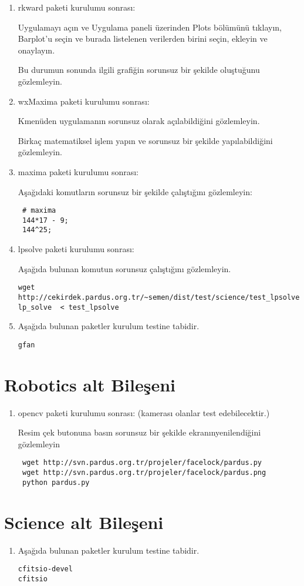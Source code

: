 \documentclass[a4paper,10pt]{article}
\begin{document}
\begin{enumerate}
\item rkward paketi kurulumu sonrası:

Uygulamayı açın ve Uygulama paneli üzerinden Plots bölümünü tıklayın, Barplot'u seçin ve burada listelenen verilerden birini seçin, ekleyin ve onaylayın. 

Bu durumun sonunda ilgili grafiğin sorunsuz bir şekilde oluştuğunu gözlemleyin.

\item wxMaxima paketi kurulumu sonrası:

Kmenüden uygulamanın sorunsuz olarak açılabildiğini gözlemleyin.

Birkaç matematiksel işlem yapın ve sorunsuz bir şekilde yapılabildiğini gözlemleyin.
\item maxima paketi kurulumu sonrası:

Aşağıdaki komutların sorunsuz bir şekilde çalıştığını gözlemleyin:
\begin{verbatim}
 # maxima
 144*17 - 9;
 144^25;
\end{verbatim}
\item lpsolve paketi kurulumu sonrası:

Aşağıda bulunan komutun sorunsuz çalıştığını gözlemleyin.

\begin{verbatim}
wget http://cekirdek.pardus.org.tr/~semen/dist/test/science/test_lpsolve
lp_solve  < test_lpsolve
\end{verbatim}


\item Aşağıda bulunan paketler kurulum testine tabidir.
\begin{verbatim}
gfan 
\end{verbatim}

\end{enumerate}

\section{Robotics alt Bileşeni}
\begin{enumerate}
 \item opencv paketi kurulumu sonrası: (kamerası olanlar test edebilecektir.)

Resim çek butonuna basın sorunsuz bir şekilde ekranınyenilendiğini gözlemleyin
\begin{verbatim}
 wget http://svn.pardus.org.tr/projeler/facelock/pardus.py
 wget http://svn.pardus.org.tr/projeler/facelock/pardus.png
 python pardus.py
\end{verbatim}


\end{enumerate}

\section{Science alt Bileşeni}
\begin{enumerate}
\item Aşağıda bulunan paketler kurulum testine tabidir.
\begin{verbatim}
cfitsio-devel 
cfitsio
\end{verbatim}

\end{enumerate}
\end{document}
